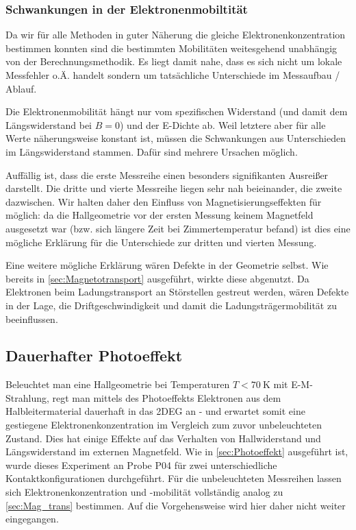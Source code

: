 \subsubsection{Schwankungen in der Elektronenmobiltität} \label{sec:Schwankungen}
Da wir für alle Methoden in guter Näherung die gleiche Elektronenkonzentration bestimmen konnten sind die bestimmten Mobilitäten weitesgehend unabhängig von der Berechnungsmethodik. Es liegt damit nahe, dass es sich nicht um lokale Messfehler o.Ä. handelt sondern um tatsächliche Unterschiede im Messaufbau / Ablauf. 

Die Elektronenmobilität hängt nur vom spezifischen Widerstand (und damit dem Längswiderstand bei $ B = 0 $) und der E-Dichte ab. Weil letztere aber für alle Werte näherungsweise konstant ist, müssen die Schwankungen aus Unterschieden im Längswiderstand stammen. Dafür sind mehrere Ursachen möglich. 

Auffällig ist, dass die erste Messreihe einen besonders signifikanten Ausreißer darstellt. Die dritte und vierte Messreihe liegen sehr nah beieinander, die zweite dazwischen. Wir halten daher den Einfluss von Magnetisierungseffekten für möglich: da die Hallgeometrie vor der ersten Messung keinem Magnetfeld ausgesetzt war (bzw. sich längere Zeit bei Zimmertemperatur befand) ist dies eine mögliche Erklärung für die Unterschiede zur dritten und vierten Messung. 

Eine weitere mögliche Erklärung wären Defekte in der Geometrie selbst. Wie bereits in \autoref{sec:Magnetotransport} ausgeführt, wirkte diese abgenutzt. Da Elektronen beim Ladungstransport an Störstellen gestreut werden, wären Defekte in der Lage, die Driftgeschwindigkeit und damit die Ladungsträgermobilität zu beeinflussen. 

\clearpage
\subsection{Dauerhafter Photoeffekt}\label{sec:Photo}

Beleuchtet man eine Hallgeometrie bei Temperaturen $T < \SI{70}{\kelvin}$ mit E-M-Strahlung, regt man mittels des Photoeffekts Elektronen aus dem Halbleitermaterial dauerhaft in das 2DEG an - und erwartet somit eine gestiegene Elektronenkonzentration im Vergleich zum zuvor unbeleuchteten Zustand. Dies hat einige Effekte auf das Verhalten von Hallwiderstand und Längswiderstand im externen Magnetfeld. Wie in \autoref{sec:Photoeffekt} ausgeführt ist, wurde dieses Experiment an  Probe P04 für zwei unterschiedliche Kontaktkonfigurationen durchgeführt. Für die unbeleuchteten Messreihen lassen sich Elektronenkonzentration und -mobilität vollständig analog zu \autoref{sec:Mag_trans} bestimmen. Auf die Vorgehensweise wird hier daher nicht weiter eingegangen. \\

